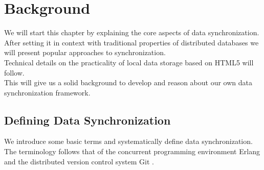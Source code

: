 
\chapter{Background}
\label{sec:background}

We will start this chapter by explaining the core aspects of data synchronization.
After setting it in context with traditional properties of distributed databases we will present popular approaches to synchronization.\\
Technical details on the practicality of local data storage based on HTML5 will follow.\\
This will give us a solid background to develop and reason about our own data synchronization framework.

\section{Defining Data Synchronization}
\label{sec:background.definition}
We introduce some basic terms and systematically define data synchronization.
The terminology follows that of the concurrent programming environment Erlang \cite{erlang} and the distributed version control system Git \cite{git}.

